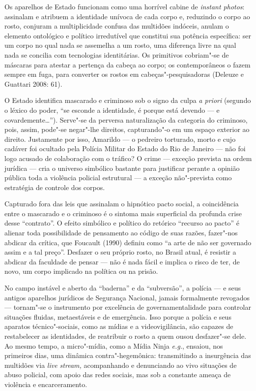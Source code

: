 Os aparelhos de Estado funcionam como uma horrível cabine de
\emph{instant photos}: assinalam e atribuem a identidade unívoca de cada
corpo e, reduzindo o corpo ao rosto, conjuram a multiplicidade confusa
das multidões indóceis, anulam o elemento ontológico e político
irredutível que constitui sua potência específica: ser um corpo no qual
nada se assemelha a um rosto, uma diferença livre na qual nada se
concilia com tecnologias identitárias. Os primitivos cobriam"-se de
máscaras para atestar a pertença da cabeça ao corpo; os contemporâneos o
fazem sempre em fuga, para converter os rostos em cabeças"-pesquisadoras
(Deleuze e Guattari 2008: 61).

O Estado identifica mascarado e criminoso sob o signo da culpa \emph{a
priori }(segundo o léxico do poder, ``se esconde a identidade, é porque
está devendo --- e covardemente\ldots{}''). Serve"-se da perversa naturalização
da categoria do criminoso, pois, assim, pode"-se negar"-lhe direitos,
capturando"-o em um espaço exterior ao direito. Justamente por isso,
Amarildo --- o pedreiro torturado, morto e cujo cadáver foi ocultado pela
Polícia Militar do Estado do Rio de Janeiro --- não foi logo acusado de
colaboração com o tráfico? O crime --- exceção prevista na ordem jurídica
--- cria o universo simbólico bastante para justificar perante a opinião
pública toda a violência policial estrutural --- a exceção não"-prevista
como estratégia de controle dos corpos.

Capturado fora das leis que assinalam o hipnótico pacto social, a
coincidência entre o mascarado e o criminoso é o sintoma mais
superficial da profunda crise desse ``contrato''. O efeito simbólico e
político do retórico ``recurso ao pacto'' é alienar toda possibilidade
de pensamento ao código de suas razões, fazer"-nos abdicar da crítica,
que Foucault (1990) definiu como ``a arte de não ser governado assim e a
tal preço''. Desfazer o seu próprio rosto, no Brasil atual, é resistir a
abdicar da faculdade de pensar --- não é nada fácil e implica o risco de
ter, de novo, um corpo implicado na política ou na prisão.

No campo instável e aberto da ``baderna'' e da ``subversão'', a polícia
--- e seus antigos aparelhos jurídicos de Segurança Nacional, jamais
formalmente revogados --- tornam"-se o instrumento por excelência de
governamentalidade para controlar situações fluidas, metaestáveis e de
emergência. Isso porque a polícia e seus aparatos técnico"-sociais, como
as mídias e a videovigilância, são capazes de restabelecer as
identidades, de reatribuir o rosto a quem ousou desfazer"-se dele. Ao
mesmo tempo, a micro"-mídia, como a Mídia Ninja \emph{e.g.}, ensaiou, nos
primeiros dias, uma dinâmica contra"-hegemônica: transmitindo a
insurgência das multidões via \emph{live stream, }acompanhando e
denunciando ao vivo situações de abuso policial, com apoio das redes
sociais, mas sob a constante ameaça de violência e encarceramento.

